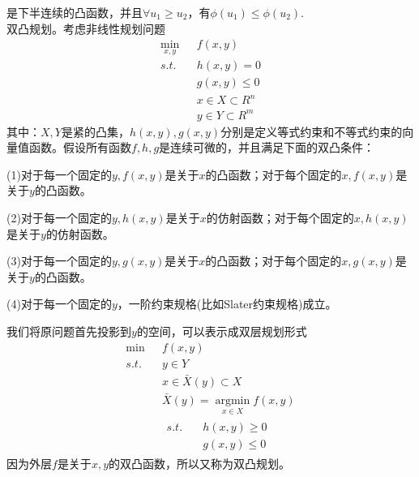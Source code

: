         是下半连续的凸函数，并且$\forall u_1\geqslant u_2$，有$\phi(u_1)\leqslant \phi(u_2)$.\\
        双凸规划。考虑非线性规划问题
        \begin{align*}
        \mathop{\min}\limits_{x,y}\  &f(x,y)\\
        s.t.\quad & h(x,y)= 0\\
        & g(x,y)\leqslant 0\\
        & x\in X\subset R^n\\
        & y\in Y\subset R^m
        \end{align*}
        其中：$X,Y$是紧的凸集，$h(x,y),g(x,y)$分别是定义等式约束和不等式约束的向量值函数。假设所有函数$f,h,g$是连续可微的，并且满足下面的双凸条件：
        \par
        (1)对于每一个固定的$y,f(x,y)$是关于$x$的凸函数；对于每个固定的$x,f(x,y)$是关于$y$的凸函数。
        \par
        (2)对于每一个固定的$y,h(x,y)$是关于$x$的仿射函数；对于每个固定的$x,h(x,y)$是关于$y$的仿射函数。
        \par
        (3)对于每一个固定的$y,g(x,y)$是关于$x$的凸函数；对于每个固定的$x,g(x,y)$是关于$y$的凸函数。
        \par
        (4)对于每一个固定的$y$，一阶约束规格(比如Slater约束规格)成立。
        \par
        我们将原问题首先投影到$y$的空间，可以表示成双层规划形式
        \begin{align*}
        \mathop{\min}\  &f(x,y)\\
        s.t.\quad & y\in Y\\
        & x\in \bar{X}(y) \subset X\\
        & \bar{X}(y)=\mathop{\arg\min}\limits_{x\in X}f(x,y)\\
        & \begin{aligned}
        s.t. \quad &h(x,y)\geqslant 0\\
        & g(x,y)\leqslant 0
        \end{aligned}
        \end{align*}
        因为外层$f$是关于$x,y$的双凸函数，所以又称为双凸规划。
